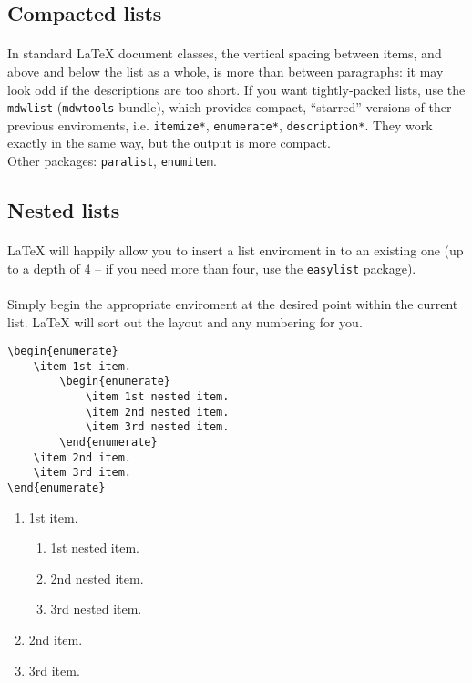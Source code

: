 \subsection{Compacted lists}
\paragraph{}
In standard \LaTeX{} document classes, the vertical spacing between items,
and above and below the list as a whole, is more than between paragraphs:
it may look odd if the descriptions are too short. If you want tightly-packed
lists, use the \verb|mdwlist| (\verb|mdwtools| bundle), which provides
compact, ``starred'' versions of ther previous enviroments, i.e.
\verb|itemize*|, \verb|enumerate*|, \verb|description*|. They work exactly
in the same way, but the output is more compact.\\
Other packages: \verb|paralist|, \verb|enumitem|.

\subsection{Nested lists}
\paragraph{}
\LaTeX{} will happily allow you to insert a list enviroment in to an existing
one (up to a depth of 4 -- if you need more than four, use the
\verb|easylist| package).
\paragraph{}
Simply begin the appropriate enviroment at the desired point within the
current list. \LaTeX{} will sort out the layout and any numbering for you.
\begin{verbatim}
\begin{enumerate}
	\item 1st item.
		\begin{enumerate}
			\item 1st nested item.
			\item 2nd nested item.
			\item 3rd nested item.
		\end{enumerate}
	\item 2nd item.
	\item 3rd item.
\end{enumerate}
\end{verbatim}
\begin{enumerate}
	\item 1st item.
\begin{enumerate}
	\item 1st nested item.
	\item 2nd nested item.
	\item 3rd nested item.
\end{enumerate}
	\item 2nd item.
	\item 3rd item.
\end{enumerate}

